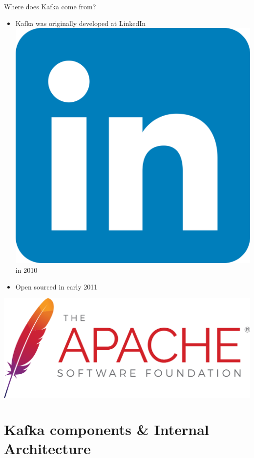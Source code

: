 \documentclass{beamer}
\begin{document}
\begin{frame}{Where does Kafka come from?}
  \begin{itemize}
    \item Kafka was originally developed at LinkedIn \includegraphics[scale=0.006]{fig/linkedin_logo.png} in 2010
    \item Open sourced in early 2011
  \end{itemize}
  \vspace*{1em}
  \hspace*{3.1em}
  \includegraphics[scale=0.17]{fig/apache_software.png}
\end{frame}

\section[Kafka components \& Internal Architecture]{Kafka components \& Internal Architecture}
\end{document}
